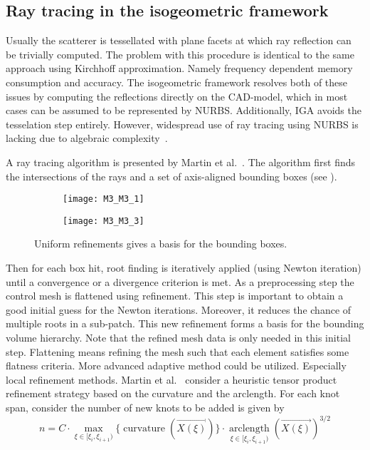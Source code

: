 \subsection{Ray tracing in the isogeometric framework}
Usually the scatterer is tessellated with plane facets at which ray reflection can be trivially computed. The problem with this procedure is identical to the same approach using Kirchhoff approximation. Namely frequency dependent memory consumption and accuracy. The isogeometric framework resolves both of these issues by computing the reflections directly on the CAD-model, which in most cases can be assumed to be represented by NURBS. Additionally, IGA avoids the tesselation step entirely. However, widespread use of ray tracing using NURBS is lacking due to algebraic complexity~\cite{Martin2000prt}.

A ray tracing algorithm is presented by Martin et al.~\cite{Martin2000prt}. The algorithm first finds the intersections of the rays and a set of axis-aligned bounding boxes (see ).
\begin{figure}
	\centering
	\begin{subfigure}[t]{\textwidth}
		\centering
		\texttt{[image: M3\_M3\_1]}
	\end{subfigure}%
	
	\begin{subfigure}[t]{\textwidth}
		\centering
		\texttt{[image: M3\_M3\_3]}
	\end{subfigure}
	\caption{Uniform refinements gives a basis for the bounding boxes.}
	\label{Fig:M3_M3}
\end{figure}
Then for each box hit, root finding is iteratively applied (using Newton iteration) until a convergence or a divergence criterion is met. As a preprocessing step the control mesh is flattened using refinement. This step is important to obtain a good initial guess for the Newton iterations. Moreover, it reduces the chance of multiple roots in a sub-patch. This new refinement forms a basis for the bounding volume hierarchy. Note that the refined mesh data is only needed in this initial step. Flattening means refining the mesh such that each element satisfies some flatness criteria. More advanced adaptive method could be utilized. Especially local refinement methods. Martin et al.~\cite{Martin2000prt} consider a heuristic tensor product refinement strategy based on the curvature and the arclength. For each knot span, consider the number of new knots to be added is given by
\begin{equation*}
	n = C\cdot\max_{\xi\in[\xi_i,\xi_{i+1})}\{\operatorname{curvature}(\vec{X(\xi)})\}\cdot\underset{\xi\in[\xi_i,\xi_{i+1})}{\operatorname{arclength}}(\vec{X(\xi)})^{3/2}
\end{equation*}
